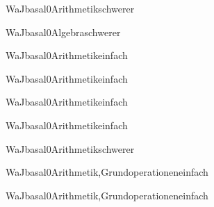 \documentclass[12pt]{article}
\begin{document}
\begin{Add}{WaJ}{basal0}{Arithmetik}{schwerer}
\end{Add}

\begin{Add}{WaJ}{basal0}{Algebra}{schwerer}
\end{Add}

\begin{Add}{WaJ}{basal0}{Arithmetik}{einfach}
\end{Add}

\begin{Add}{WaJ}{basal0}{Arithmetik}{einfach}
\end{Add}

\begin{Add}{WaJ}{basal0}{Arithmetik}{einfach}
\end{Add}

\begin{Add}{WaJ}{basal0}{Arithmetik}{einfach}
\end{Add}

\begin{Add}{WaJ}{basal0}{Arithmetik}{schwerer}
\end{Add}

\begin{Add}{WaJ}{basal0}{Arithmetik,Grundoperationen}{einfach}
\end{Add}

\begin{Add}{WaJ}{basal0}{Arithmetik,Grundoperationen}{einfach}
\end{Add}
\end{document}

